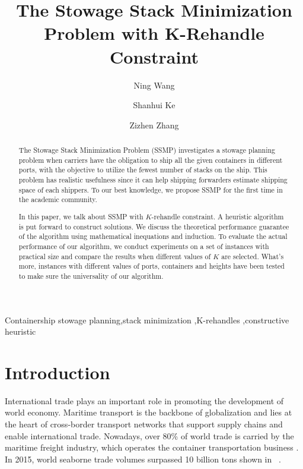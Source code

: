 \documentclass[review,3p,times,authoryear,12pt]{elsarticle}
\begin{document}
\begin{frontmatter}
\newpage

\title{The Stowage Stack Minimization Problem with K-Rehandle Constraint}
\author[shu]{Ning Wang}

\author[shu]{Shanhui Ke}

\author[syu]{Zizhen Zhang}

\address[shu]{
Department of Information Management, School of Management, Shanghai University, Shanghai, China
}
\address[syu]{
School of Data and Computer Science, Sun Yat-Sen University, China
}


\begin{abstract}
The Stowage Stack Minimization Problem (SSMP) investigates a stowage planning problem when carriers have the obligation to ship all the given containers in different ports, with the objective to utilize the fewest number of stacks on the ship. This problem has realistic usefulness since it can help shipping forwarders estimate shipping space of each shippers.
To our best knowledge, we propose SSMP for the first time in the academic community.

In this paper, we talk about SSMP with $K$-rehandle constraint. A heuristic algorithm is put forward to construct solutions. We discuss the theoretical performance guarantee of the algorithm using mathematical inequations and induction.
To evaluate the actual performance of our algorithm, we conduct experiments on a set of instances with practical size and compare the results when different values of $K$ are selected.
What's more, instances with different values of ports, containers and heights have been tested to make sure the universality of our algorithm.
\end{abstract}

\begin{keyword}
Containership stowage planning\sep stack minimization \sep K-rehandles \sep constructive heuristic
\end{keyword}
\end{frontmatter}


\section{Introduction}
\label{sec:i}
International trade plays an important role in promoting the development of world economy.
Maritime transport is the backbone of globalization and lies at the heart of cross-border transport networks that support supply chains and enable international trade.
Nowadays, over 80\% of world trade is carried by the maritime freight industry, which operates the container transportation business \citep{zhang2016multiobjective}.
In 2015, world seaborne trade volumes surpassed 10 billion tons shown in ~\cite{unctad2016}.
\end{document}
